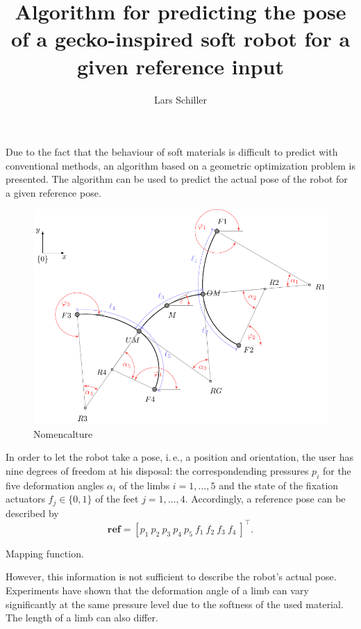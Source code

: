 \documentclass[10pt,a4paper]{article}
\author{Lars Schiller}
\title{Algorithm for predicting the pose of a gecko-inspired soft robot for a given reference input}
\begin{document}
\maketitle

Due to the fact that the behaviour of soft materials is difficult to predict with conventional methods, an algorithm based on a geometric optimization problem is presented.
The algorithm can be used to predict the actual pose of the robot for a given reference pose.

\begin{figure}
\includegraphics[scale=1]{../Pics/model/model.pdf}
\caption{Nomencalture}
\label{fig:model}
\end{figure}

In order to let the robot take a pose, i.\,e., a position and orientation, the user has nine degrees of freedom at his disposal: the correspondending pressures $p_i$ for the five deformation angles $\alpha_i$ of the limbs $i=1,\dots,5$ and the state of the fixation actuators $f_j \in \{0,1\}$ of the feet $j=1,\dots,4$.
Accordingly, a reference pose can be described by
\begin{equation}
\bm{ref} = \left[ p_1~p_2~p_3~p_4~p_5~f_1~f_2~f_3~f_4~ \right]^\top.
\end{equation}


Mapping function.
\vspace{1cm}

However, this information is not sufficient to describe the robot's actual pose.
Experiments have shown that the deformation angle of a limb can vary significantly  at the same pressure level due to the softness of the used material. The length of a limb can also differ.
\end{document}
